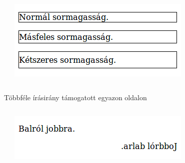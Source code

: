 \begin{frame}
  \begin{columns}[c]
      \begin{exampleblock}{}
        \scriptsize
        
        
      \end{exampleblock}
      \includegraphics[width=\textwidth]{sormagassag.png}
  \end{columns}
\end{frame}

\begin{frame}
  Többféle írásirány támogatott egyazon oldalon
  \begin{columns}[c]
      \begin{exampleblock}{}
        \footnotesize
        
        
      \end{exampleblock}
      \includegraphics[width=\textwidth]{irasirany.png}
  \end{columns}  
\end{frame}

